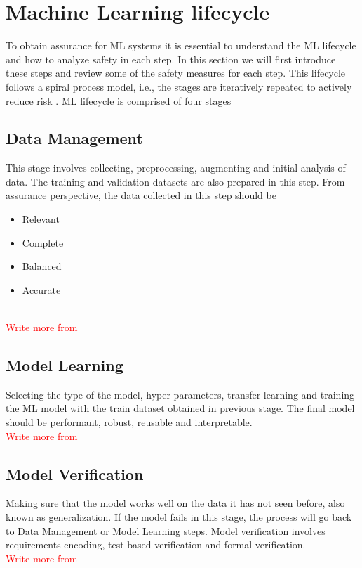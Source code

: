 \section{Machine Learning lifecycle}

To obtain assurance for ML systems it is essential to understand the ML lifecycle and how to analyze safety in each step. In this section we will first introduce these steps and review some of the safety measures for each step. This lifecycle follows a spiral process model, i.e., the stages are iteratively repeated to actively reduce risk \cite{Boehm2000}. ML lifecycle is comprised of four stages \cite{Ashmore2021} 

\subsection{Data Management}
This stage involves collecting, preprocessing, augmenting and initial analysis of data. The training and validation datasets are also prepared in this step.
From assurance perspective, the data collected in this step should be
\begin{itemize}
    \item Relevant
    \item Complete
    \item Balanced
    \item Accurate 
\end{itemize}

\\\textcolor{red}{Write more from \cite{Ashmore2021}}

\subsection{Model Learning}
Selecting the type of the model, hyper-parameters, transfer learning and training the ML model with the train dataset obtained in previous stage.
The final model should be performant, robust, reusable and interpretable. \\\textcolor{red}{Write more from \cite{Ashmore2021}}

\subsection{Model Verification} 
Making sure that the model works well on the data it has not seen before, also known as generalization. If the model fails in this stage, the process will go back to Data Management or Model Learning steps. Model verification involves requirements encoding, test-based verification and formal verification.\\\textcolor{red}{Write more from \cite{Ashmore2021}}

